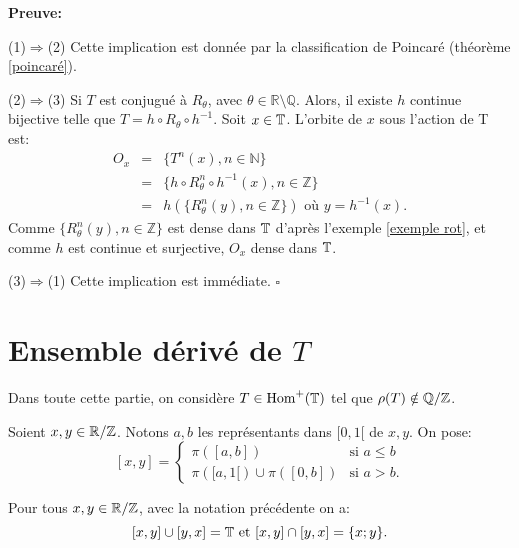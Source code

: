	\textbf{Preuve:}
	\par (1)$\Rightarrow$(2) Cette implication est donnée par la classification de Poincaré (théorème \ref{poincaré}).\\

	\par (2)$\Rightarrow$(3) Si $T$ est conjugué à $R_{\theta}$, avec $\theta \in \mathbb{R}\setminus \mathbb{Q}$. Alors, il existe $h$ continue bijective telle que $T=h\circ R_\theta \circ h^{-1}$. Soit $x\in {\mathbb{T}}$. L'orbite de $x$ sous l'action de T est:
	\begin{eqnarray*}
		O_x&=&\lbrace T^n(x), n \in \mathbb{N} \rbrace \\
		&=& \lbrace h\circ R_\theta^n \circ h^{-1}(x), n \in \mathbb{Z} \rbrace\\
		&=& h(\lbrace R^n_\theta(y), n \in \mathbb{Z}\rbrace)\text{ où } y = h^{-1}(x).
	\end{eqnarray*}
	Comme $\lbrace R^n_\theta(y), n \in \mathbb{Z}\rbrace$ est dense dans ${\mathbb{T}}$ d'après l'exemple \ref{exemple rot}, et comme $h$ est continue et surjective, $O_x$ dense dans ${\mathbb{T}}$.\\


	\par (3)$\Rightarrow$(1) Cette implication est immédiate. \hfill $\square$









\section{Ensemble dérivé de $T$}
Dans toute cette partie, on considère $T \in \mathrm{Hom}^+({\mathbb{T}})$ tel que $\rho(T) \notin {\mathbb{Q}}/{\mathbb{Z}}$.

\begin{notation}
	Soient $x,y \in {\mathbb{R}}/\mathbb{Z}$. Notons $a,b$ les représentants dans $[0,1[$ de $x,y$. On pose:
	$$[x,y] = \left\{
	\begin{array}{ll}
		\pi([a,b]) & \text{si } a\leq b \\
		\pi([a,1[)\cup \pi([0,b]) & \mbox{si } a>b.
	\end{array}
	\right.
	$$
\end{notation}

\begin{rmq}
	Pour tous $x, y \in {\mathbb{R}}/\mathbb{Z}$, avec la notation précédente on a:
	$$[x,y]\cup[y,x]={\mathbb{T}} \text{ et } [x,y]\cap[y,x]=\lbrace x; y\rbrace.$$
\end{rmq}

